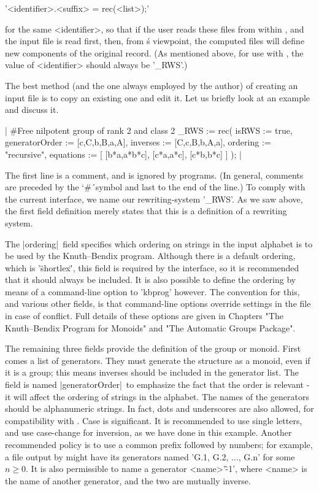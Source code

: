 '<identifier>.<suffix> \:= rec(<list>);'

for the same <identifier>, so that if the user reads these files from
within {\GAP}, and the input file is read first, then, from {\GAP}\'s
viewpoint, the computed files will define new components of the original
record. (As mentioned above, for use with {\GAP}, the value of
<identifier> should always be '\_RWS'.)

The best method (and the one always employed by the author)
of creating an input file is to copy an existing one and edit it.
Let us briefly look at an example and discuss it.

|
#Free nilpotent group of rank 2 and class 2
_RWS := rec(
           isRWS := true,
  generatorOrder := [c,C,b,B,a,A],
        inverses := [C,c,B,b,A,a],
        ordering := "recursive",
       equations := [
         [b*a,a*b*c], [c*a,a*c], [c*b,b*c]
       ]
);
|

The first line is a comment, and is ignored by programs. (In general,
comments are preceded by the `\#\'\ symbol and last to the end of the line.)
To comply with the current {\GAP} interface, we name our rewriting-system
'\_RWS'.
As we saw above, the first field definition merely states that this is a
definition of a rewriting system.

The |ordering|\ field specifies which
ordering on strings in the input alphabet is to be used by the Knuth--Bendix
program. Although there is a default ordering, which is '\"shortlex\"',
this field is required by the {\GAP} interface, so it is recommended that
it should always be included.
It is also possible
to define the ordering by means of a command-line option to 'kbprog'
however. The convention for this, and various other fields, is that
command-line options override settings in the file in case of conflict.
Full details of these options are given in Chapters
"The Knuth--Bendix Program for Monoids" and "The Automatic Groups Package".

The remaining three fields provide the definition of the group or monoid.
First comes a list of generators. They must generate the structure as a monoid,
even if it is a group; this means inverses should be included in the generator
list. The field is named |generatorOrder|\ to emphasize the fact that the
order is relevant - it will affect the ordering of strings in the alphabet.
The names of the generators should be alphanumeric strings. In fact,
dots and underscores are also allowed, for compatibility with {\GAP}.
Case is significant. It is recommended to use single letters, and use
case-change for inversion, as we have done in this example. Another
recommended policy is to use a common prefix followed by numbers; for
example, a file output by {\GAP} might have its generators named
'G.1, G.2, ..., G.n' for some $n \ge 0$. It is also permissible to name a
generator <name>'\^-1', where <name> is the name of another generator, and
the two are mutually inverse.


